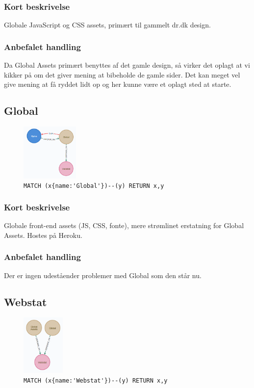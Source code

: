 \documentclass{article}
\begin{document}
\subsubsection*{Kort beskrivelse}
Globale JavaScript og CSS assets, primært til gammelt dr.dk design.
\subsubsection*{Anbefalet handling}
Da Global Assets primært benyttes af det gamle design, så virker det oplagt at vi kikker på om det giver mening at bibeholde de gamle sider. Det kan meget vel give mening at få ryddet lidt op og her kunne være et oplagt sted at starte.


\subsection{Global}
\begin{figure}[H]
\includegraphics[width=80pt]{Global.PNG}
\cprotect\caption{\verb|MATCH (x{name:'Global'})--(y) RETURN x,y|}
\end{figure}
\subsubsection*{Kort beskrivelse}
Globale front-end assets (JS, CSS, fonte), mere strømlinet erstatning for Global Assets. Hostes på Heroku.
\subsubsection*{Anbefalet handling}
Der er ingen udeståender problemer med Global som den står nu.


\subsection{Webstat}
\begin{figure}[H]
\includegraphics[width=60pt]{Webstat.PNG}
\cprotect\caption{\verb|MATCH (x{name:'Webstat'})--(y) RETURN x,y|}
\end{figure}
\end{document}
